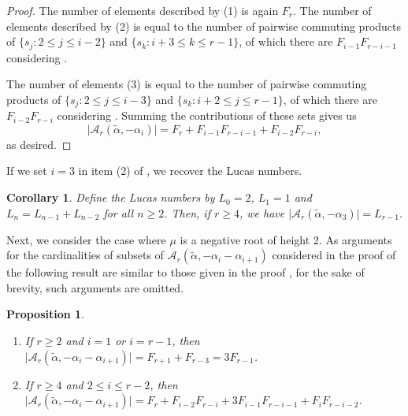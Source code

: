 \documentclass{amsart}
\newtheorem{proposition}[theorem]{Proposition}
\newtheorem{corollary}[theorem]{Corollary}
\theoremstyle{definition}
\newcommand{\hroot}{\tilde{\alpha}}
\begin{document}
\begin{proof}
The number of elements described by (1) is again $F_{r}$. 
The number of elements described by (2) is equal to the number of pairwise commuting products of $\{s_j: 2 \leq j \leq i-2\}$ and $\{s_k: i+3 \leq k \leq r-1\}$, of which there are $F_{i-1}F_{r-i-1}$ considering .

The number of elements (3) is equal to the number of pairwise commuting products of $\{s_j: 2 \leq j \leq i-3\}$ and $\{s_k:  i+2 \leq j \leq r-1\}$, of which there are $F_{i-2}F_{r-i}$ considering .
Summing the contributions of these sets gives us
\[\vert\mathcal{A}_r(\hroot,-\alpha_i)\vert=F_r+F_{i-1}F_{r-i-1}+F_{i-2}F_{r-i},\] as desired.
\end{proof}

If we set $i = 3$ in item (2) of , we recover the Lucas numbers.

\begin{corollary}
Define the Lucas numbers by $L_0 = 2$, $L_1 = 1$ and $L_n = L_{n-1} +L_{n-2}$ for all $n \geq 2$. Then, if $r \geq 4$, we have $\vert \mathcal{A}_r(\hroot, -\alpha_3) \vert = L_{r-1}$.
\end{corollary}
Next, we consider the case where $\mu$ is a negative root of height 2. As arguments for the cardinalities of subsets of $\mathcal{A}_r(\hroot,-\alpha_i - \alpha_{i+1})$ considered in the proof of the following result are similar to those given in the proof , for the sake of brevity, such arguments are omitted.

\begin{proposition} $ $
\begin{enumerate}
    \item If $r\geq 2$ and $i = 1$ or $i = r-1$, then $\vert \mathcal{A}_r(\hroot,-\alpha_i - \alpha_{i+1})\vert= F_{r+1} + F_{r-3} = 3 F_{r-1}$.
    \item If $r\geq 4$ and $2 \leq i \leq r-2$, then $\vert \mathcal{A}_r(\hroot,-\alpha_i - \alpha_{i+1})\vert = F_{r} + F_{i-2}F_{r-i} + 3 F_{i-1} F_{r-i-1} + F_{i} F_{r-i-2}$. 
\end{enumerate}
\end{proposition}
\end{document}
